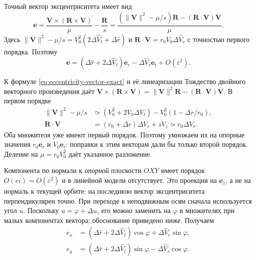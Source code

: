 \documentclass[a4paper,11pt]{article}
\numberwithin{equation}{section}
\theoremstyle{remark}
\begin{document}
Точный вектор эксцентриситета имеет вид
\begin {equation}
 \boldsymbol e=
 \frac{{\boldsymbol V\times(\boldsymbol R\times\boldsymbol V)}}{{\mu}}
 -\frac{{\boldsymbol R}}{{s}}
 =\frac{{(\lVert\boldsymbol V\rVert^2-\mu/s)\boldsymbol R
       -(\boldsymbol R\mathbin{\cdot}\boldsymbol V)\boldsymbol V}}{{\mu}}.
 \label {eq:eccentricity-vector-exact}
\end {equation}
Здесь
$\lVert\boldsymbol V\rVert^2-\mu/s=V_0^2(2\Delta\widehat V_t+\Delta\widehat r)$ и
$\boldsymbol R\mathbin{\cdot}\boldsymbol V=r_0V_0\Delta\widehat V_r$
с точностью первого порядка. Поэтому
\[
 \boldsymbol e=(\Delta\widehat r+2\Delta\widehat V_t)\boldsymbol e_r-\Delta\widehat V_r\boldsymbol e_t
 +O(\varepsilon^2).
\]
\begin{explanation}{К формуле \eqref{eq:eccentricity-vector-exact} и её линеаризации}
Тождество двойного векторного произведения даёт
$\boldsymbol V\times(\boldsymbol R\times\boldsymbol V)
=\lVert\boldsymbol V\rVert^2\boldsymbol R
-(\boldsymbol R\cdot\boldsymbol V)\boldsymbol V$.
В первом порядке
\[
\begin{aligned}
\lVert\boldsymbol V\rVert^2-\mu/s
 &\simeq (V_0^2+2V_0\Delta V_t)
       -V_0^2(1-\Delta r/r_0),\\
\boldsymbol R\cdot\boldsymbol V
 &=(r_0+\Delta r)\Delta V_r+zV_z\simeq r_0\Delta V_r.
\end{aligned}
\]
Оба множителя уже имеют первый порядок. Поэтому умножаем их
на опорные значения $r_0\boldsymbol e_r$ и $V_0\boldsymbol e_t$:
поправки к этим векторам дали бы только второй порядок.
Деление на $\mu=r_0V_0^2$ даёт указанное разложение.
\end{explanation}
Компонента по нормали к \emph{опорной} плоскости $OXY$ имеет
порядок $O(ei)=O(\varepsilon^2)$ и в линейной модели отсутствует.
Это проекция на $\boldsymbol e_z$, а не на нормаль к текущей
орбите: на последнюю вектор эксцентриситета перпендикулярен точно.
При переходе к неподвижным осям сначала используется угол $u$.
Поскольку $u=\varphi+\Delta u$, его можно заменить на $\varphi$
в множителях при малых компонентах вектора; обоснование приведено
ниже. Получаем
\begin {equation}
 \boxed{\begin {aligned}
  e_x&=(\Delta\widehat r+2\Delta\widehat V_t)\cos\varphi+\Delta\widehat V_r\sin\varphi,\\
  e_y&=(\Delta\widehat r+2\Delta\widehat V_t)\sin\varphi-\Delta\widehat V_r\cos\varphi.
 \end {aligned}}
 \label {eq:eccentricity-state}
\end {equation}
\end{document}
